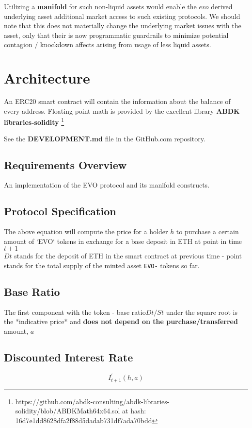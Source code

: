 Utilizing a \textbf{manifold} for such non-liquid assets would enable the $ evo $ derived underlying asset additional market access to such existing protocols. We should note that this does not materially change the underlying market issues with the asset, only that their is now programmatic guardrails to minimize potential contagion / knockdown affects arising from usage of less liquid  assets.




\section{Architecture}


An ERC20 smart contract will contain the information about the balance of every address.
Floating point math is provided by the excellent library \textbf{ABDK libraries-solidity} 
\footnote{https://github.com/abdk-consulting/abdk-libraries-solidity/blob/ABDKMath64x64.sol at hash: 16d7e1dd8628dfa2f88d5dadab731df7ada70bdd }

See the \textbf{DEVELOPMENT.md} file in the GitHub.com repository.

\subsection{Requirements Overview}

An implementation of the EVO protocol and its manifold constructs.

\subsection{Protocol Specification}
The above equation will compute the price for a holder $h$ to purchase a certain amount of `EVO` tokens in exchange for a base deposit in ETH at point in time  $t +1$  \\
$Dt$ stands for the deposit of ETH in the smart contract at previous time - point %
stands for the total supply of the minted asset \texttt{EVO-} tokens so far.

\subsection{Base Ratio}
The first component with the token - base ratio\neweline $ Dt/St $ under the square root is the *indicative price* and \textbf{does not depend on the purchase/transferred} amount, $a$

\subsection{Discounted Interest Rate}
\begin{equation}
	I_{t+1}^{\prime}(h, a)
\end{equation}

